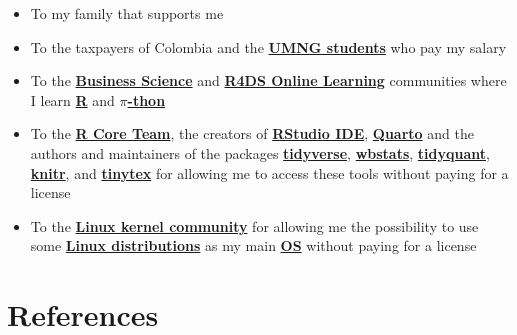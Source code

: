 \documentclass[
  ignorenonframetext,
]{beamer}
\begin{document}
\begin{frame}{}
\label{section-17}
\begin{itemize}
\item
  To my family that supports me
\item
  To the taxpayers of Colombia and the
  \href{https://www.umng.edu.co/estudiante}{\textbf{UMNG students}} who
  pay my salary
\item
  To the \href{https://www.business-science.io/}{\textbf{Business
  Science}} and \href{https://www.rfordatasci.com/}{\textbf{R4DS Online
  Learning}} communities where I learn
  \href{https://www.r-project.org/about.html}{\textbf{R}} and
  \href{https://www.python.org/about/}{\textbf{\(\pi\)-thon}}
\item
  To the \href{https://www.r-project.org/contributors.html}{\textbf{R
  Core Team}}, the creators of
  \href{https://rstudio.com/products/rstudio/}{\textbf{RStudio IDE}},
  \href{https://quarto.org/}{\textbf{Quarto}} and the authors and
  maintainers of the packages
  \href{https://CRAN.R-project.org/package=tidyverse}{\textbf{tidyverse}},
  \href{https://CRAN.R-project.org/package=wbstats}{\textbf{wbstats}},
  \href{https://CRAN.R-project.org/package=tidyquant}{\textbf{tidyquant}},
  \href{https://CRAN.R-project.org/package=knitr}{\textbf{knitr}}, and
  \href{https://CRAN.R-project.org/package=tinytex}{\textbf{tinytex}}
  for allowing me to access these tools without paying for a license
\item
  To the \href{https://www.kernel.org/category/about.html}{\textbf{Linux
  kernel community}} for allowing me the possibility to use some
  \href{https://static.lwn.net/Distributions/}{\textbf{Linux
  distributions}} as my main
  \href{https://en.wikipedia.org/wiki/Operating_system}{\textbf{OS}}
  without paying for a license
\end{itemize}
\end{frame}

\section*{References}\label{references}
\end{document}
